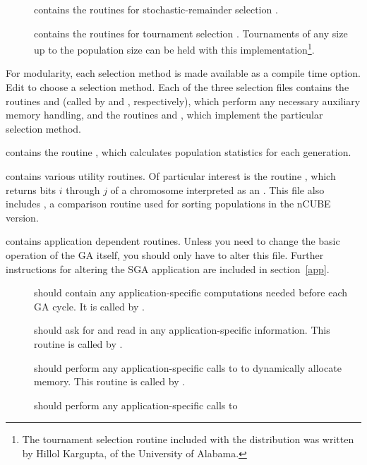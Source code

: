 \begin{description}
\begin{description}
\item[{}] contains the routines for stochastic-remainder selection 
\cite{Booker:82}.
\item[{}] contains the routines for tournament selection 
\cite{Brindle:81a}.  Tournaments of any size up to the population size can be held
with this implementation\footnote{The tournament selection routine
included with the distribution was written by Hillol Kargupta, of the University
of Alabama.}.
\end{description}
For modularity, each selection method 
is made available as a compile time option.
Edit {} to choose a selection method. Each of the three
selection files 
contains the routines
{} and {} (called by {} and {}, respectively), which perform
any necessary auxiliary memory handling,
and the routines {} and {}, 
which implement the particular selection method.
\item[{\btt{stats.c}}] contains the routine {}, which calculates 
population statistics for each generation.
\item[{\btt{utility.c}}] contains various utility routines. Of particular interest 
is the routine {}, which returns bits $i$ through $j$ of a 
chromosome interpreted as an {}. 
This file also includes {}, 
a comparison routine used for
sorting populations in the nCUBE version.
\item[{\btt{app.c}}] contains application dependent routines. 
Unless you need to change the basic operation of the GA itself, 
you should only have to alter this file.
Further instructions for altering the SGA application are 
included in section~\ref{app}.
\begin{description}
\item[{}] should contain any application-specific computations
needed before each GA cycle.  It is called by {}.
\item[{}] should ask for and read in any application-specific 
information.  This routine is 
called by {}.
\item[{}] should perform any application-specific calls to 
{} to dynamically allocate memory.  This routine is 
called by {}.
\item[{}]  should perform any application-specific calls to 

\end{description}
\end{description}
